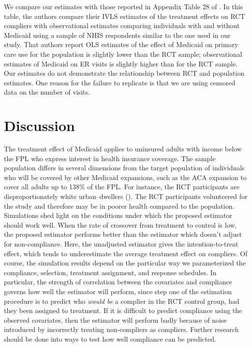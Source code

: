 \documentclass[12pt]{article}
\begin{document}
We compare our estimates with those reported in Appendix Table 28 of \citet{finkelstein2012}. In this table, the authors compare their IVLS estimates of the treatment effects on RCT compliers with observational estimates comparing individuals with and without Medicaid using a sample of NHIS respondents similar to the one used in our study. That authors report OLS estimates of the effect of Medicaid on primary care use for the population is slightly lower than the RCT sample; observational estimates of Medicaid on ER visits is slightly higher than for the RCT sample. Our estimates do not demonstrate the relationship between RCT and population estimates. One reason for the failure to replicate is that we are using censored data on the number of visits. 


\section{Discussion}

The treatment effect of Medicaid applies to uninsured adults with income below the FPL who express interest in health insurance coverage. The sample population differs in several dimensions from the target population of individuals who will be covered by other Medicaid expansions, such as the ACA expansion to cover all adults up to 138\% of the FPL. For instance, the RCT participants are disproportionately white urban--dwellers (\cite{Taubman}). The RCT participants volunteered for the study and therefore may be in poorer health compared to the population. \\

Simulations shed light on the conditions under which the proposed estimator should work well.  When the rate of crossover from treatment to control is low, the proposed estimator performs better than the estimator which doesn't adjust for non-compliance.  Here, the unadjusted estimator gives the intention-to-treat effect, which tends to underestimate the average treatment effect on compliers. Of course, the simulation results depend on the particular way we parameterized the compliance, selection, treatment assignment, and response schedules.  In particular, the strength of correlation between the covariates and compliance governs how well the estimator will perform, since step one of the estimation procedure is to predict who \textit{would be} a complier in the RCT control group, had they been assigned to treatment. If it is difficult to predict compliance using the observed covariates, then the estimator will perform badly because of noise introduced by incorrectly treating non-compliers as compliers.  Further research should be done into ways to test how well compliance can be predicted. \\
\end{document}
